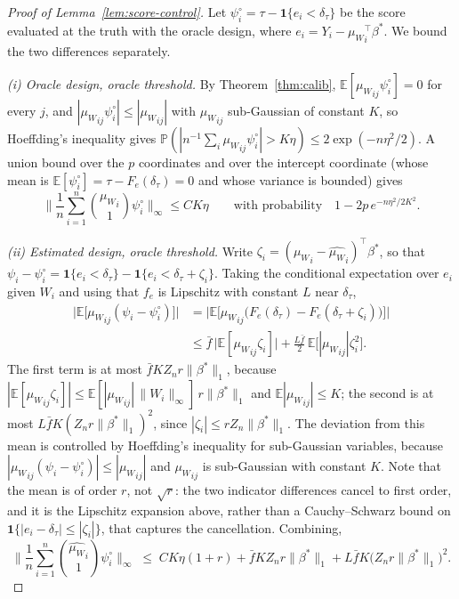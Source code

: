 \documentclass[12pt,a4paper]{article}
\theoremstyle{definition}
\theoremstyle{remark}
\newcommand{\E}{\mathbb{E}}
\newcommand{\Pbb}{\mathbb{P}}
\newcommand{\ind}[1]{\mathbf{1}\{#1\}}
\newcommand{\betas}{\beta^*}
\newcommand{\muv}{\mu_W}
\begin{document}
\begin{proof}[Proof of Lemma~\ref{lem:score-control}]
Let $\psi_i^\circ = \tau-\ind{e_i<\delta_\tau}$ be the score evaluated at the truth with the
oracle design, where $e_i=Y_i-{\muv}_i^\top\betas$. We bound the two differences separately.

\emph{(i) Oracle design, oracle threshold.} By Theorem~\ref{thm:calib},
$\E[{\muv}_{ij}\psi_i^\circ]=0$ for every $j$, and $|{\muv}_{ij}\psi_i^\circ|\le|{\muv}_{ij}|$ with
${\muv}_{ij}$ sub-Gaussian of constant $K$, so Hoeffding's inequality gives
$\Pbb(|n^{-1}\sum_i{\muv}_{ij}\psi_i^\circ|>K\eta)\le2\exp(-n\eta^2/2)$. A union bound over
the $p$ coordinates and over the intercept coordinate (whose mean is
$\E[\psi_i^\circ]=\tau-F_e(\delta_\tau)=0$ and whose variance is bounded) gives
\begin{equation*}
\Big\|\frac1n\sum_{i=1}^n\binom{{\muv}_i}{1}\psi_i^\circ\Big\|_\infty \le C K\eta
\qquad\text{with probability}\quad 1-2p\,e^{-n\eta^2/2K^2}.
\end{equation*}

\emph{(ii) Estimated design, oracle threshold.} Write
$\zeta_i=({\muv}_i-{\hat{\muv}}_i)^\top\betas$, so that
$\psi_i-\psi_i^\circ=\ind{e_i<\delta_\tau}-\ind{e_i<\delta_\tau+\zeta_i}$. Taking the
conditional expectation over $e_i$ given $W_i$ and using that $f_e$ is Lipschitz with
constant $L$ near $\delta_\tau$,
\begin{equation*}
\begin{split}
\Big|\E\big[{\muv}_{ij}(\psi_i-\psi_i^\circ)\big]\Big|
&= \Big|\E\big[{\muv}_{ij}\big(F_e(\delta_\tau)-F_e(\delta_\tau+\zeta_i)\big)\big]\Big| \\
&\le \bar f\,\big|\E[{\muv}_{ij}\zeta_i]\big|
 + \frac{L\bar f}{2}\,\E\big[|{\muv}_{ij}|\zeta_i^2\big].
\end{split}
\end{equation*}
The first term is at most $\bar f K Z_nr\|\betas\|_1$, because
$|\E[{\muv}_{ij}\zeta_i]|\le\E[|{\muv}_{ij}|\,\|W_i\|_\infty]\,r\|\betas\|_1$ and
$\E|{\muv}_{ij}|\le K$; the second is at most $L\bar fK(Z_nr\|\betas\|_1)^2$, since
$|\zeta_i|\le rZ_n\|\betas\|_1$. The
deviation from this mean is controlled by Hoeffding's inequality for sub-Gaussian variables,
because $|{\muv}_{ij}(\psi_i-\psi_i^\circ)|\le|{\muv}_{ij}|$ and ${\muv}_{ij}$ is sub-Gaussian
with constant $K$. Note that the mean is of order $r$, not $\sqrt r$: the two indicator
differences cancel to first order, and it is the Lipschitz expansion above, rather than a
Cauchy--Schwarz bound on $\ind{|e_i-\delta_\tau|\le|\zeta_i|}$, that captures the
cancellation. Combining,
\begin{equation*}
\Big\|\frac1n\sum_{i=1}^n\binom{{\hat{\muv}}_i}{1}\psi_i^\circ\Big\|_\infty
\;\le\; CK\eta(1+r) + \bar f K Z_nr\|\betas\|_1 + L\bar fK\big(Z_nr\|\betas\|_1\big)^2 .
\end{equation*}


\end{proof}
\end{document}
